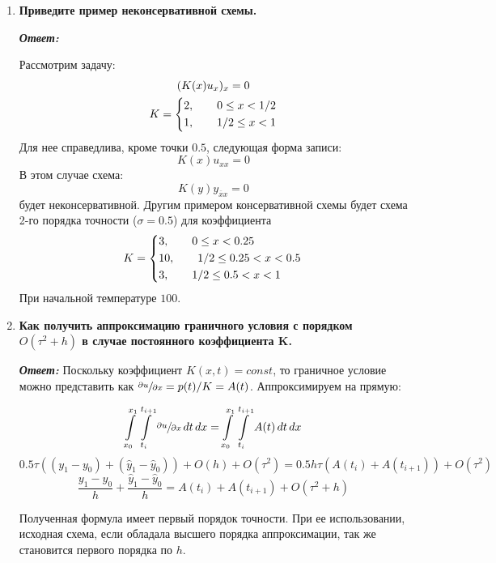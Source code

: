 \documentclass[12pt, a4paper]{article}
\begin{document}
	\begin{enumerate}
		\item \textbf{Приведите пример неконсервативной схемы.}
		\vspace*{0.2cm}
		
		\textit{\textbf{Ответ:}}
		
		Рассмотрим задачу: 
		\begin{gather}
			(K(x) u_x)_x = 0 \notag \\
			K = \begin{dcases}
				2, \qquad 0 \le x < 1/2 \\
				1 , \qquad 1/2 \le x < 1 \\
			 \end{dcases}
		\end{gather}
		Для нее справедлива, кроме точки $0.5$, следующая форма записи:
		\[K(x)u_{xx} = 0\]
		В этом случае схема:
		\[
		K(y)y_{\overline{x}x} = 0
		\]
		будет неконсервативной.
		Другим примером консервативной схемы будет схема 2-го порядка точности ($\sigma = 0.5$) для коэффициента
		\begin{gather}
			K = \begin{dcases}
				3, \qquad 0 \le x < 0.25\\
				10 , \qquad 1/2 \le 0.25 < x < 0.5 \\
				3 , \qquad 1/2 \le 0.5 < x < 1 
			\end{dcases} 
		\end{gather}
		При начальной температуре $100$.
		
	
		\item \textbf{Как получить аппроксимацию граничного условия с порядком $O(\tau^2+h)$ в случае постоянного коэффициента K.}
		\vspace*{0.2cm}
		
		\textit{\textbf{Ответ:}}
		Поскольку коэффициент $K(x, t)=const$, то граничное условие можно представить как $\sfrac{\partial u}{\partial x} = p(t) / K = A(t)$. Аппроксимируем на прямую:
		
		\[
		\int\limits_{x_0}^{x_1}\int\limits_{t_{i}}^{t_{i+1}} \sfrac{\partial u}{\partial x}\, dt\,dx =  \int\limits_{x_0}^{x_1}\int\limits_{t_{i}}^{t_{i+1}} A(t) \, dt \, dx
		\]
		\[
		0.5\tau ((y_1 - y_0) + (\hat{y}_1 - \hat{y}_0) ) + O(h) + O(\tau^2) = 0.5 h \tau (A(t_i) + A(t_{i+1})) + O(\tau^2)
		\]
		\[
		\dfrac{y_1 - y_0}{h} + \dfrac{\hat{y}_1 - \hat{y}_0}{h} =  A(t_i) + A(t_{i+1}) + O(\tau^2 + h)
		\]
		
		Полученная формула имеет первый порядок точности. При ее использовании, исходная схема, если обладала высшего порядка аппроксимации, так же становится первого порядка по $h$.
		

\end{enumerate}
\end{document}
